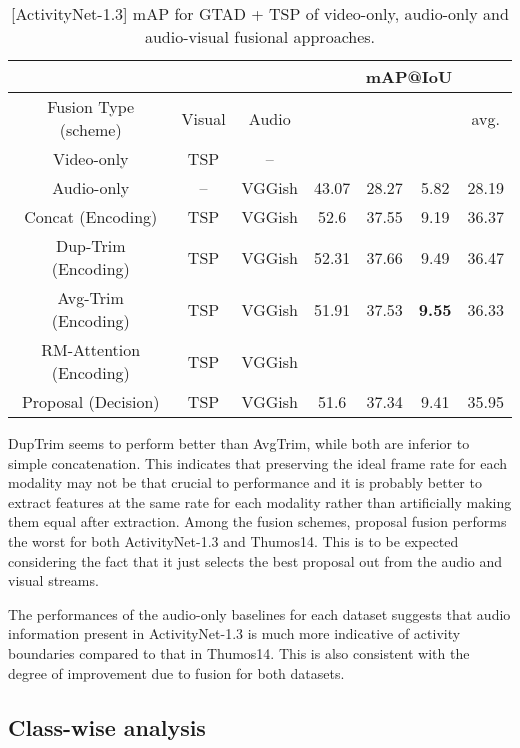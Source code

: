 \documentclass[10pt,twocolumn,letterpaper]{article}
\begin{document}
\begin{table}[!t]
\centering
\resizebox{\linewidth}{!}
{
\centering
\begin{tabular}{c|c|c|c|c|c|c}
       & &  & \multicolumn{4}{c}{mAP@IoU} \\
\toprule

 Fusion Type (scheme) & Visual  & Audio &  &  &  & avg. \\
\toprule
  Video-only & TSP & -- &  &  &  &  \\ 
  \midrule
  Audio-only & -- & VGGish & 43.07 & 28.27 & 5.82 &  28.19 \\
   \midrule
   Concat (Encoding) & TSP & VGGish & 52.6 & 37.55 & 9.19 & 36.37 \\
   \midrule
   Dup-Trim (Encoding) & TSP & VGGish & 52.31 & 37.66 & 9.49 & 36.47 \\
   \midrule
   Avg-Trim (Encoding) & TSP & VGGish & 51.91 & 37.53 & \textbf{9.55} & 36.33 \\
   \midrule
  RM-Attention (Encoding) & TSP & VGGish &  &  &  &   \\
 \midrule
   Proposal (Decision) & TSP & VGGish &  51.6	& 37.34	& 9.41 & 35.95   \\
 \bottomrule
\end{tabular}
}
\caption{[ActivityNet-1.3] mAP for GTAD\cite{Xu_2020_CVPR} + TSP\cite{DBLP:journals/corr/abs-2011-11479} of video-only, audio-only and audio-visual fusional approaches.}
\label{tab:topav-anet}
\end{table}

DupTrim seems to perform better than AvgTrim, while both are inferior to simple concatenation. This indicates that preserving the ideal frame rate for each modality may not be that crucial to performance and it is probably better to extract features at the same rate for each modality rather than artificially making them equal after extraction. Among the fusion schemes, proposal fusion performs the worst for both ActivityNet-1.3 and Thumos14. This is to be expected considering the fact that it just selects the best proposal out from the audio and visual streams. 

The performances of the audio-only baselines for each dataset suggests that audio information present in ActivityNet-1.3 is much more indicative of activity boundaries compared to that in Thumos14. This is also consistent with the degree of improvement due to fusion for both datasets. 

\subsection{Class-wise analysis} 
\end{document}
